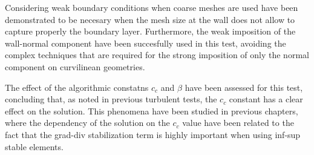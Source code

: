 Considering weak boundary conditions when coarse meshes are used have been demonstrated to be necesary when the mesh size at the wall does not allow to capture properly the boundary layer. Furthermore, the weak imposition of the wall-normal component have been succesfully used in this test, avoiding the complex techniques that are required for the strong imposition of only the normal component on curvilinean geometries.

The effect of the algorithmic constatns $ c_c $ and $ \beta $ have been assessed for this test, concluding that, as noted in previous turbulent tests, the $ c_c $ constant has a clear effect on the solution. This phenomena have been studied in previous chapters, where the dependency of the solution on the $ c_c $ value have been related to the fact that the grad-div stabilization term is highly important when using inf-sup stable elements.



